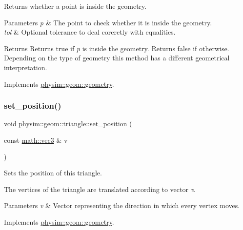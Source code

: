 Returns whether a point is inside the geometry. 


\begin{DoxyParams}{Parameters}
{\em p} & The point to check whether it is inside the geometry. \\
\hline
{\em tol} & Optional tolerance to deal corerctly with equalities. \\
\hline
\end{DoxyParams}
\begin{DoxyReturn}{Returns}
Returns true if {\itshape p} is inside the geometry. Returns false if otherwise. Depending on the type of geometry this method has a different geometrical interpretation. 
\end{DoxyReturn}


Implements \hyperlink{classphysim_1_1geom_1_1geometry_ab7aa1a32927e96ed384a93b84fbd62b7}{physim\+::geom\+::geometry}.

\mbox{\label{classphysim_1_1geom_1_1triangle_a796f186962d3757ebbdee9fdfdb1ecaa}} 
\subsubsection{\texorpdfstring{set\+\_\+position()}{set\_position()}}
{\footnotesize\ttfamily void physim\+::geom\+::triangle\+::set\+\_\+position (\begin{DoxyParamCaption}\item[{const \hyperlink{structphysim_1_1math_1_1vec3}{math\+::vec3} \&}]{v }\end{DoxyParamCaption})\hspace{0.3cm}{\ttfamily [virtual]}}



Sets the position of this triangle. 

The vertices of the triangle are translated according to vector {\itshape v}. 
\begin{DoxyParams}{Parameters}
{\em v} & Vector representing the direction in which every vertex moves. \\
\hline
\end{DoxyParams}


Implements \hyperlink{classphysim_1_1geom_1_1geometry_adbd7c270a0b49c2c6d085457a20bfa69}{physim\+::geom\+::geometry}.

